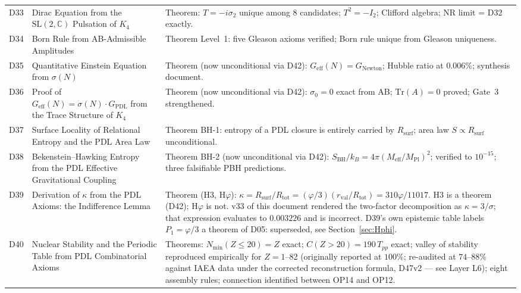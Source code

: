 \documentclass[11pt,a4paper]{article}
\theoremstyle{plain}
\theoremstyle{definition}
\theoremstyle{remark}
\newcommand{\Geff}{G_{\mathrm{eff}}}
\newcommand{\GPDL}{G_{\mathrm{PDL}}}
\newcommand{\rval}{r_{\mathrm{val}}}
\newcommand{\Rsurf}{R_{\mathrm{surf}}}
\newcommand{\Rtot}{R_{\mathrm{tot}}}
\newcommand{\sigmaN}{\sigma(N)}
\newcommand{\SBH}{S_{\mathrm{BH}}}
\newcommand{\Meff}{M_{\mathrm{eff}}}
\newcommand{\MPl}{M_{\mathrm{Pl}}}
\newcommand{\Tpp}{T_{pp}}
\begin{document}
\begin{longtable}{L{1.3cm}L{3.8cm}L{8.0cm}}
D33 & Dirac Equation from the $\mathrm{SL}(2,\mathbb{C})$ Pulsation of $K_4$~\cite{D33} & \textcolor{proofblue}{Theorem}: $T=-i\sigma_2$ unique among 8 candidates; $T^2=-I_2$; Clifford algebra; NR limit = D32 exactly.\\[0.3em]
D34 & Born Rule from AB-Admissible Amplitudes~\cite{D34} & \textcolor{proofblue}{Theorem} Level~1: five Gleason axioms verified; Born rule unique from Gleason uniqueness.\\[0.3em]
D35 & Quantitative Einstein Equation from $\sigmaN$~\cite{D35} & \textcolor{proofblue}{Theorem} (now unconditional via D42): $G_{\mathrm{eff}}(N)=G_{\mathrm{Newton}}$; Hubble ratio at $0.006\%$; synthesis document.\\[0.3em]
D36 & Proof of $\Geff(N)=\sigmaN\cdot\GPDL$ from the Trace Structure of $K_4$~\cite{D36} & \textcolor{proofblue}{Theorem} (now unconditional via D42): $\sigma_0=0$ exact from AB; $\mathrm{Tr}(A)=0$ proved; Gate~3 strengthened.\\[0.4em]
D37 & Surface Locality of Relational Entropy and the PDL Area Law~\cite{D37} & \textcolor{proofblue}{Theorem BH-1}: entropy of a PDL closure is entirely carried by $\Rsurf$; area law $S\propto\Rsurf$ unconditional.\\[0.3em]
D38 & Bekenstein--Hawking Entropy from the PDL Effective Gravitational Coupling~\cite{D38} & \textcolor{proofblue}{Theorem BH-2} (now unconditional via D42): $\SBH/k_B=4\pi(\Meff/\MPl)^2$; verified to $10^{-15}$; three falsifiable PBH predictions.\\[0.3em]
D39 & Derivation of $\kappa$ from the PDL Axioms: the Indifference Lemma~\cite{D39} & \textcolor{proofblue}{Theorem (H3, H$\varphi$)}: $\kappa=\Rsurf/\Rtot=(\varphi/3)(\rval/\Rtot)=310\varphi/11017$. H3 is a theorem (D42); H$\varphi$ is not. \textcolor{negativered}{v33 of this document rendered the two-factor decomposition as $\kappa=3/\sigma$; that expression evaluates to $0.003226$ and is incorrect.} D39's own epistemic table labels $P_1=\varphi/3$ a theorem of D05: superseded, see Section~\ref{sec:Hphi}.\\[0.4em]
D40 & Nuclear Stability and the Periodic Table from PDL Combinatorial Axioms~\cite{D40} & \textcolor{proofblue}{Theorems}: $N_{\min}(Z\leq20)=Z$ exact; $C(Z>20)=190\,\Tpp$ exact; valley of stability reproduced empirically for $Z=1$--82 (originally reported at $100\%$; re-audited at $74$--$88\%$ against IAEA data under the corrected reconstruction formula, D47v2 --- see Layer L6); eight assembly rules; connection identified between OP14 and OP12.\\[0.4em]

\end{longtable}
\end{document}
